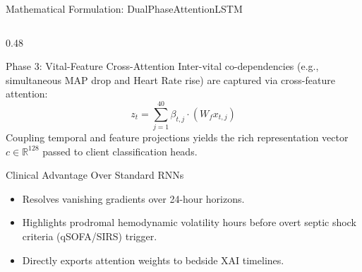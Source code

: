 \documentclass[aspectratio=169, 10pt]{beamer}
\begin{document}
\begin{frame}{Mathematical Formulation: DualPhaseAttentionLSTM}
\begin{columns}[t]
        \begin{column}{0.48\textwidth}
            \begin{alertblock}{Phase 3: Vital-Feature Cross-Attention}
                \scriptsize
                Inter-vital co-dependencies (e.g., simultaneous MAP drop and Heart Rate rise) are captured via cross-feature attention:
                \begin{equation*}
                    z_t = \sum_{j=1}^{40} \beta_{t, j} \cdot (W_f x_{t, j})
                \end{equation*}
                Coupling temporal and feature projections yields the rich representation vector $c \in \mathbb{R}^{128}$ passed to client classification heads.
            \end{alertblock}
            
            \begin{exampleblock}{Clinical Advantage Over Standard RNNs}
                \scriptsize
                \begin{itemize}
                    \item Resolves vanishing gradients over 24-hour horizons.
                    \item Highlights prodromal hemodynamic volatility hours before overt septic shock criteria (qSOFA/SIRS) trigger.
                    \item Directly exports attention weights to bedside XAI timelines.
                \end{itemize}
            \end{exampleblock}
        \end{column}
    \end{columns}
\end{frame}
\end{document}

